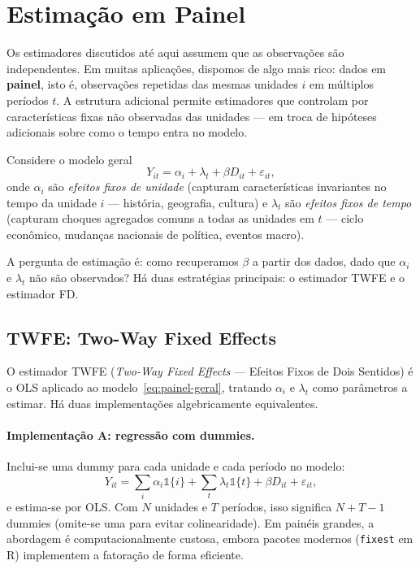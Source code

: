 \section{Estimação em Painel}
\label{subsec:painel-estimacao}

Os estimadores discutidos até aqui assumem que as observações são independentes. Em muitas aplicações, dispomos de algo mais rico: dados em \textbf{painel}, isto é, observações repetidas das mesmas unidades $i$ em múltiplos períodos $t$. A estrutura adicional permite estimadores que controlam por características fixas não observadas das unidades --- em troca de hipóteses adicionais sobre como o tempo entra no modelo.

Considere o modelo geral
\begin{equation}
Y_{it} = \alpha_i + \lambda_t + \beta D_{it} + \varepsilon_{it},
\label{eq:painel-geral}
\end{equation}
onde $\alpha_i$ são \textit{efeitos fixos de unidade} (capturam características invariantes no tempo da unidade $i$ --- história, geografia, cultura) e $\lambda_t$ são \textit{efeitos fixos de tempo} (capturam choques agregados comuns a todas as unidades em $t$ --- ciclo econômico, mudanças nacionais de política, eventos macro).

A pergunta de estimação é: como recuperamos $\beta$ a partir dos dados, dado que $\alpha_i$ e $\lambda_t$ não são observados? Há duas estratégias principais: o estimador TWFE e o estimador FD.

\subsection{TWFE: Two-Way Fixed Effects}
\label{subsubsec:twfe}

O estimador TWFE (\textit{Two-Way Fixed Effects} --- Efeitos Fixos de Dois Sentidos) é o OLS aplicado ao modelo~\eqref{eq:painel-geral}, tratando $\alpha_i$ e $\lambda_t$ como parâmetros a estimar. Há duas implementações algebricamente equivalentes.

\paragraph{Implementação A: regressão com dummies.} Inclui-se uma dummy para cada unidade e cada período no modelo:
\[
Y_{it} = \sum_i \alpha_i \mathds{1}\{i\} + \sum_t \lambda_t \mathds{1}\{t\} + \beta D_{it} + \varepsilon_{it},
\]
e estima-se por OLS. Com $N$ unidades e $T$ períodos, isso significa $N + T - 1$ dummies (omite-se uma para evitar colinearidade). Em painéis grandes, a abordagem é computacionalmente custosa, embora pacotes modernos (\texttt{fixest} em R) implementem a fatoração de forma eficiente.

